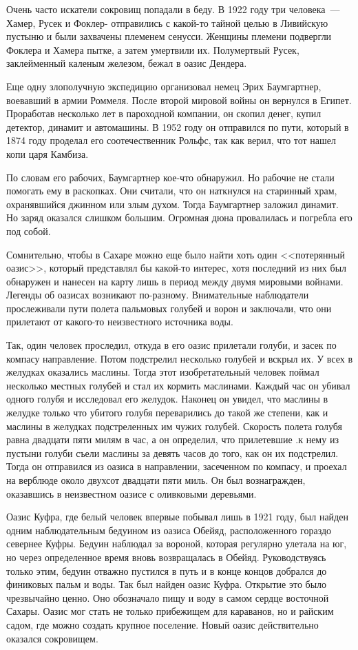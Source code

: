 \documentclass[12pt,a4paper,twoside,openany,svgnames]{memoir}
\begin{document}
Очень часто искатели сокровищ попадали в беду. В 1922 году три человека~--- Хамер, Русек и Фоклер- отправились с какой-то тайной целью в Ливийскую пустыню и были захвачены племенем сенусси. Женщины племени подвергли Фоклера и Хамера пытке, а затем умертвили их. Полумертвый Русек, заклейменный каленым железом, бежал в оазис Дендера.

Еще одну злополучную экспедицию организовал немец Эрих Баумгартнер, воевавший в армии Роммеля. После второй мировой войны он вернулся в Египет. Проработав несколько лет в пароходной компании, он скопил денег, купил детектор, динамит и автомашины. В 1952 году он отправился по пути, который в 1874 году проделал его соотечественник Рольфс, так как верил, что тот нашел копи царя Камбиза.

По словам его рабочих, Баумгартнер кое-что обнаружил. Но рабочие не стали помогать ему в раскопках. Они считали, что он наткнулся на старинный храм, охранявшийся джинном или злым духом. Тогда Баумгартнер заложил динамит. Но заряд оказался слишком большим. Огромная дюна провалилась и погребла его под собой.

Сомнительно, чтобы в Сахаре можно еще было найти хоть один <<потерянный оазис>>, который представлял бы какой-то интерес, хотя последний из них был обнаружен и нанесен на карту лишь в период между двумя мировыми войнами. Легенды об оазисах возникают по-разному. Внимательные наблюдатели прослеживали пути полета пальмовых голубей и ворон и заключали, что они прилетают от какого-то неизвестного источника воды.

Так, один человек проследил, откуда в его оазис прилетали голуби, и засек по компасу направление. Потом подстрелил несколько голубей и вскрыл их. У всех в желудках оказались маслины. Тогда этот изобретательный человек поймал несколько местных голубей и стал их кормить маслинами. Каждый час он убивал одного голубя и исследовал его желудок. Наконец он увидел, что маслины в желудке только что убитого голубя переварились до такой же степени, как и маслины в желудках подстреленных им чужих голубей. Скорость полета голубя равна двадцати пяти милям в час, а он определил, что прилетевшие .к нему из пустыни голуби съели маслины за девять часов до того, как он их подстрелил. Тогда он отправился из оазиса в направлении, засеченном по компасу, и проехал на верблюде около двухсот двадцати пяти миль. Он был вознагражден, оказавшись в неизвестном оазисе с оливковыми деревьями.

Оазис Куфра, где белый человек впервые побывал лишь в 1921 году, был найден одним наблюдательным бедуином из оазиса Обейяд, расположенного гораздо севернее Куфры. Бедуин наблюдал за вороной, которая регулярно улетала на юг, но через определенное время вновь возвращалась в Обейяд. Руководствуясь только этим, бедуин отважно пустился в путь и в конце концов добрался до финиковых пальм и воды. Так был найден оазис Куфра. Открытие это было чрезвычайно ценно. Оно обозначало пищу и воду в самом сердце восточной Сахары. Оазис мог стать не только прибежищем для караванов, но и райским садом, где можно создать крупное поселение. Новый оазис действительно оказался сокровищем.
\end{document}
